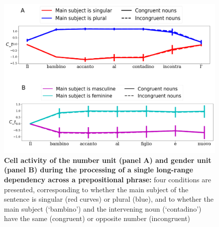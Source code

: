 \begin{figure}
    \centering
    \includegraphics[width=\textwidth]{figures/model_activations_nounpp.png}
    \caption{\textbf{Cell activity of the number unit (panel A) and gender unit (panel B) during the processing of a single long-range dependency across a prepositional phrase:} four conditions are presented, corresponding to whether the main subject of the sentence is singular (red curves) or plural (blue), and to whether the main subject (`bambino') and the intervening noun (`contadino') have the same (congruent) or opposite number (incongruent)}
    \label{fig:nounpp}
\end{figure} 

